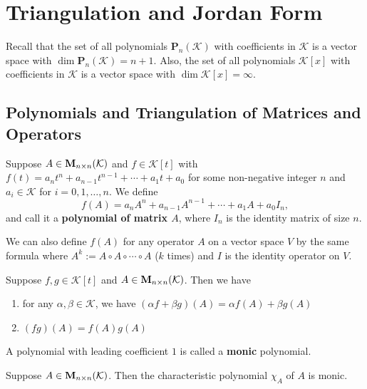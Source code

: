 \chapter{Triangulation and Jordan Form}
Recall that the set of all polynomials $\mathbf P_n(\mathcal{K})$ with coefficients in $\mathcal{K}$ is a vector space with $\dim \mathbf P_n(\mathcal{K}) = n+1$. Also, the set of all polynomials $\mathcal{K}[x]$ with coefficients in $\mathcal{K}$ is a vector space with $\dim \mathcal K[x] = \infty$.
\section{Polynomials and Triangulation of Matrices and Operators}
\begin{definitionenv}
    Suppose $A\in \mathbf{M}_{n\times n}(\mathcal{K})$ and $f\in \mathcal{K}[t]$ with $f(t) = a_n t^n + a_{n-1} t^{n-1} + \cdots + a_1 t + a_0$ for some non-negative integer $n$ and $a_i \in \mathcal K$ for $i=0,1,\ldots,n$. We define
    $$ f(A) = a_n A^n + a_{n-1} A^{n-1} + \cdots + a_1 A + a_0 I_n, $$
    and call it a \textbf{polynomial of matrix $A$}, where $I_n$ is the identity matrix of size $n$.
\end{definitionenv}
\begin{remarkenv}
    We can also define $f(A)$ for any operator $A$ on a vector space $V$ by the same formula where $A^k := A \circ A \circ \cdots \circ A$ ($k$ times) and $I$ is the identity operator on $V$.
\end{remarkenv}
\begin{theoremenv}\label{thm: properties of polynomial of matrix}
    Suppose $f,g\in \mathcal K[t]$ and $A\in \mathbf{M}_{n\times n}(\mathcal{K})$. Then we have
    \begin{enumerate}[label=(\arabic*)]
        \item for any $\alpha, \beta \in \mathcal K$, we have $(\alpha f + \beta g)(A) = \alpha f(A) + \beta g(A)$
        \item $(fg)(A) = f(A) g(A)$
    \end{enumerate}
\end{theoremenv}
\begin{definitionenv}
    A polynomial with leading coefficient $1$ is called a \textbf{monic} polynomial. 
\end{definitionenv}
\begin{exampleenv}
    Suppose $A\in \mathbf{M}_{n\times n}(\mathcal{K})$. Then the characteristic polynomial $\chi_A$ of $A$ is monic.
\end{exampleenv}
